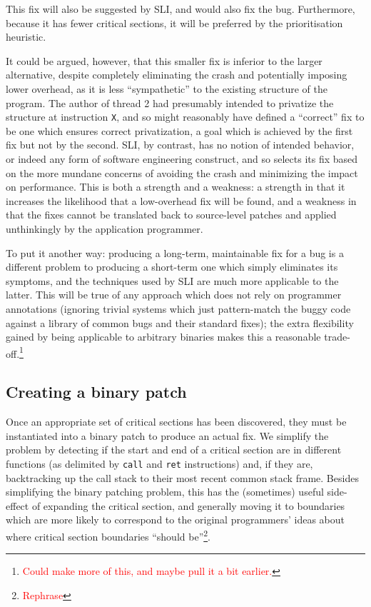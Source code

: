 \documentclass[10pt,twocolumn,preprint,natbib,authoryear]{sigplanconf}
\newcommand{\editorial}[1]{\textcolor{red}{\footnote{\textcolor{red}{#1}}}}
\begin{document}
This fix will also be suggested by SLI, and would also fix the bug.
Furthermore, because it has fewer critical sections, it will be
preferred by the prioritisation heuristic.

It could be argued, however, that this smaller fix is inferior to the
larger alternative, despite completely eliminating the crash and
potentially imposing lower overhead, as it is less ``sympathetic'' to
the existing structure of the program.  The author of thread 2 had
presumably intended to privatize the structure at instruction
\verb|X|, and so might reasonably have defined a ``correct'' fix to be
one which ensures correct privatization, a goal which is achieved by
the first fix but not by the second.  SLI, by contrast, has no notion
of intended behavior, or indeed any form of software engineering
construct, and so selects its fix based on the more mundane concerns
of avoiding the crash and minimizing the impact on performance.  This
is both a strength and a weakness: a strength in that it increases the
likelihood that a low-overhead fix will be found, and a weakness in
that the fixes cannot be translated back to source-level patches and
applied unthinkingly by the application programmer.

To put it another way: producing a long-term, maintainable fix for a
bug is a different problem to producing a short-term one which simply
eliminates its symptoms, and the techniques used by SLI are much more
applicable to the latter.  This will be true of any approach which
does not rely on programmer annotations (ignoring trivial systems
which just pattern-match the buggy code against a library of common
bugs and their standard fixes); the extra flexibility gained by being
applicable to arbitrary binaries makes this a reasonable
trade-off.\editorial{Could make more of this, and maybe pull it a bit
  earlier.}

\subsection{Creating a binary patch}
\label{sect:binpatch}

Once an appropriate set of critical sections has been discovered, they
must be instantiated into a binary patch to produce an actual fix.  We
simplify the problem by detecting if the start and end of a critical
section are in different functions (as delimited by \verb|call| and
\verb|ret| instructions) and, if they are, backtracking up the call
stack to their most recent common stack frame.  Besides simplifying
the binary patching problem, this has the (sometimes) useful
side-effect of expanding the critical section, and generally moving it
to boundaries which are more likely to correspond to the original
programmers' ideas about where critical section boundaries ``should
be''\editorial{Rephrase}.
\end{document}
